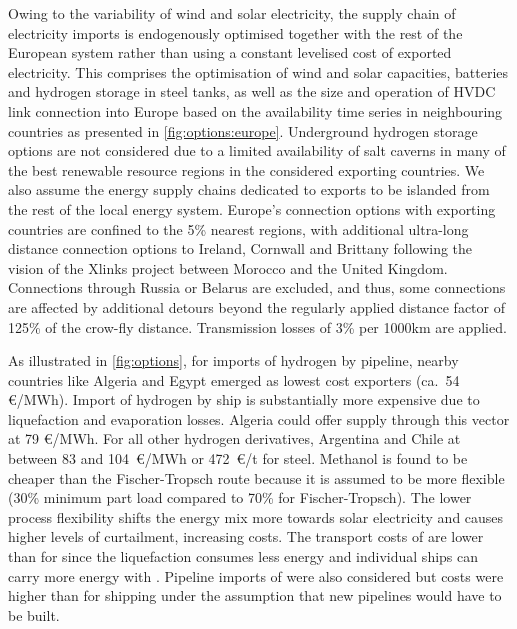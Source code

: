 Owing to the variability of wind and solar electricity, the supply chain of
electricity imports is endogenously optimised together with the rest of the
European system rather than using a constant levelised cost of exported
electricity. This comprises the optimisation of wind and solar capacities,
batteries and hydrogen storage in steel tanks, as well as the size and operation
of HVDC link connection into Europe based on the availability time series in
neighbouring countries as presented in \cref{fig:options:europe}. Underground
hydrogen storage options are not considered due to a limited availability of
salt caverns in many of the best renewable resource regions in the considered
exporting countries.\cite{hevinUndergroundStorage2019} We also assume the energy
supply chains dedicated to exports to be islanded from the rest of the local
energy system. Europe's connection options with exporting countries are confined
to the 5\% nearest regions, with additional ultra-long distance connection
options to Ireland, Cornwall and Brittany following the vision of the Xlinks
project between Morocco and the United Kingdom.\cite{xlinksMoroccoUKPower2023}
Connections through Russia or Belarus are excluded, and thus, some connections
are affected by additional detours beyond the regularly applied distance factor
of 125\% of the crow-fly distance. Transmission losses of 3\% per 1000km are
applied.


As illustrated in \cref{fig:options}, for imports of hydrogen by pipeline,
nearby countries like Algeria and Egypt emerged as lowest cost exporters (ca.~54
\euro{}/MWh). Import of hydrogen by ship is substantially more expensive due to
liquefaction and evaporation losses. Algeria could offer supply through this
vector at 79 \euro{}/MWh. For all other hydrogen derivatives, Argentina and
Chile at between 83 and 104~\euro{}/MWh or 472~\euro{}/t for steel. Methanol is
found to be cheaper than the Fischer-Tropsch route because it is assumed to be
more flexible (30\% minimum part load compared to 70\% for
Fischer-Tropsch).\cite{brownUltralongdurationEnergy2023} The lower process
flexibility shifts the energy mix more towards solar electricity and causes
higher levels of curtailment, increasing costs. The transport costs of
 are lower than for  since the liquefaction consumes
less energy and individual ships can carry more energy with .
Pipeline imports of  were also considered but costs were higher
than for  shipping under the assumption that new pipelines would
have to be built.



